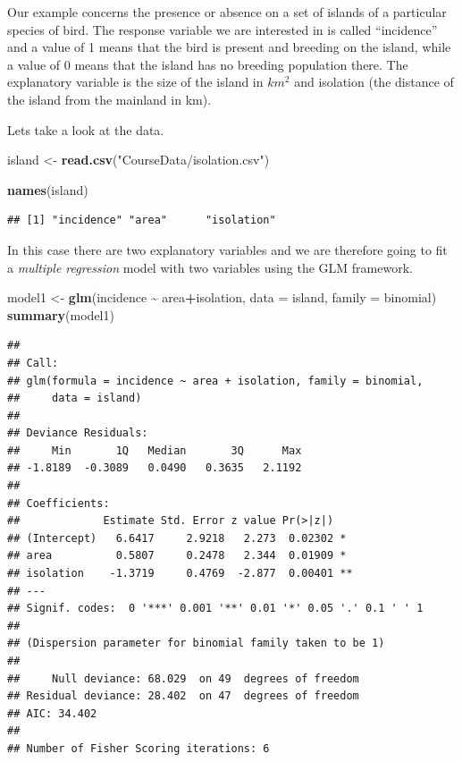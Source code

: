 \documentclass[
  a4paperpaper,
]{book}
\newenvironment{Shaded}{\begin{snugshade}}{\end{snugshade}}
\newcommand{\DataTypeTok}[1]{\textcolor[rgb]{0.13,0.29,0.53}{#1}}
\newcommand{\KeywordTok}[1]{\textcolor[rgb]{0.13,0.29,0.53}{\textbf{#1}}}
\newcommand{\NormalTok}[1]{#1}
\newcommand{\OperatorTok}[1]{\textcolor[rgb]{0.81,0.36,0.00}{\textbf{#1}}}
\newcommand{\StringTok}[1]{\textcolor[rgb]{0.31,0.60,0.02}{#1}}
\begin{document}
Our example concerns the presence or absence on a set of islands of a particular species of bird. The response variable we are interested in is called ``incidence'' and a value of 1 means that the bird is present and breeding on the island, while a value of 0 means that the island has no breeding population there. The explanatory variable is the size of the island in \(km^2\) and isolation (the distance of the island from the mainland in km).

Lets take a look at the data.

\begin{Shaded}
\begin{Highlighting}[]
\NormalTok{island \textless{}{-}}\StringTok{ }\KeywordTok{read.csv}\NormalTok{(}\StringTok{"CourseData/isolation.csv"}\NormalTok{)}

\KeywordTok{names}\NormalTok{(island)}
\end{Highlighting}
\end{Shaded}

\begin{verbatim}
## [1] "incidence" "area"      "isolation"
\end{verbatim}

In this case there are two explanatory variables and we are therefore going to fit a \emph{multiple regression} model with two variables using the GLM framework.

\begin{Shaded}
\begin{Highlighting}[]
\NormalTok{model1 \textless{}{-}}\StringTok{ }\KeywordTok{glm}\NormalTok{(incidence }\OperatorTok{\textasciitilde{}}\StringTok{ }\NormalTok{area}\OperatorTok{+}\NormalTok{isolation, }\DataTypeTok{data =}\NormalTok{ island, }\DataTypeTok{family =}\NormalTok{ binomial)}
\KeywordTok{summary}\NormalTok{(model1)}
\end{Highlighting}
\end{Shaded}

\begin{verbatim}
## 
## Call:
## glm(formula = incidence ~ area + isolation, family = binomial, 
##     data = island)
## 
## Deviance Residuals: 
##     Min       1Q   Median       3Q      Max  
## -1.8189  -0.3089   0.0490   0.3635   2.1192  
## 
## Coefficients:
##             Estimate Std. Error z value Pr(>|z|)   
## (Intercept)   6.6417     2.9218   2.273  0.02302 * 
## area          0.5807     0.2478   2.344  0.01909 * 
## isolation    -1.3719     0.4769  -2.877  0.00401 **
## ---
## Signif. codes:  0 '***' 0.001 '**' 0.01 '*' 0.05 '.' 0.1 ' ' 1
## 
## (Dispersion parameter for binomial family taken to be 1)
## 
##     Null deviance: 68.029  on 49  degrees of freedom
## Residual deviance: 28.402  on 47  degrees of freedom
## AIC: 34.402
## 
## Number of Fisher Scoring iterations: 6
\end{verbatim}
\end{document}
